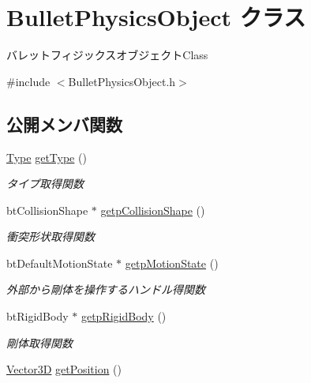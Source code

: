 \hypertarget{class_bullet_physics_object}{}\section{Bullet\+Physics\+Object クラス}
\label{class_bullet_physics_object}


バレットフィジックスオブジェクト\+Class  




{\ttfamily \#include $<$Bullet\+Physics\+Object.\+h$>$}

\subsection*{公開メンバ関数}
\begin{DoxyCompactItemize}
\item 
\mbox{\hyperlink{class_bullet_physics_object_ac428a5598df5fd4a450197e021420927}{Type}} \mbox{\hyperlink{class_bullet_physics_object_a12027754be0d44356ab98617b7579a52}{get\+Type}} ()
\begin{DoxyCompactList}\small\item\em タイプ取得関数 \end{DoxyCompactList}\item 
bt\+Collision\+Shape $\ast$ \mbox{\hyperlink{class_bullet_physics_object_a436ec7f8e40865bc240eaf5669a43bf9}{getp\+Collision\+Shape}} ()
\begin{DoxyCompactList}\small\item\em 衝突形状取得関数 \end{DoxyCompactList}\item 
bt\+Default\+Motion\+State $\ast$ \mbox{\hyperlink{class_bullet_physics_object_a92b00adf82adf916a8b6c3e8c7570926}{getp\+Motion\+State}} ()
\begin{DoxyCompactList}\small\item\em 外部から剛体を操作するハンドル得関数 \end{DoxyCompactList}\item 
bt\+Rigid\+Body $\ast$ \mbox{\hyperlink{class_bullet_physics_object_a711db1c0266db2f0fc3d8baa44c6e1ab}{getp\+Rigid\+Body}} ()
\begin{DoxyCompactList}\small\item\em 剛体取得関数 \end{DoxyCompactList}\item 
\mbox{\hyperlink{class_vector3_d}{Vector3D}} \mbox{\hyperlink{class_bullet_physics_object_a02e592eaa6470b7df077ae1f58db9323}{get\+Position}} ()

\end{DoxyCompactItemize}
